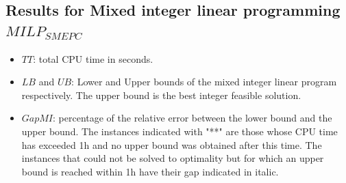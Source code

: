 \documentclass[11pt]{article}
\theoremstyle{plain}%
\theoremstyle{definition} \newtheorem{lem}{Lemma}[section]
\theoremstyle{definition} \newtheorem{claim}{Claim}[lem]
\theoremstyle{definition} \newtheorem{theorem}{Theorem}[section]
\theoremstyle{definition} \newtheorem{exo}{Exercice n$^\circ$}
\theoremstyle{definition} \newtheorem{quest}{}[exo]
\theoremstyle{definition} \newtheorem{sousquest}{}[quest]
\theoremstyle{remark}
\theoremstyle{definition}
\begin{document}
\subsection{Results for Mixed integer linear programming $MILP_{SMEPC}$ }

 \begin{itemize}
\item $TT$: total CPU time in seconds.
\item $LB$ and $UB$: Lower and Upper bounds  of the mixed integer linear program respectively. The upper bound is the best integer feasible solution.
\item $GapMI$: percentage of the relative error between the lower bound and the upper bound. 
The instances indicated with "**" are those whose CPU time has exceeded 1h and no upper bound was obtained after this time. The instances that could not be solved to optimality but for which an upper bound is reached within 1h have their gap indicated in italic.
\end{itemize}
\end{document}
